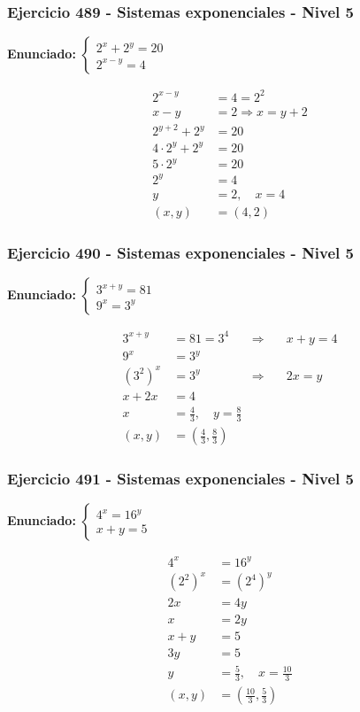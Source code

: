 \documentclass[12pt,a4paper]{article}
\begin{document}
\subsubsection*{Ejercicio 489 - Sistemas exponenciales - Nivel 5}
\textbf{Enunciado:} \(\begin{cases}2^x+2^y=20\\ 2^{x-y}=4\end{cases}\)

\[
\begin{aligned}
2^{x-y}&=4=2^2\\
x-y&=2\Rightarrow x=y+2\\
2^{y+2}+2^y&=20\\
4\cdot2^y+2^y&=20\\
5\cdot2^y&=20\\
2^y&=4\\
y&=2,
\quad x=4\\
(x,y)&=\boxed{(4,2)}
\end{aligned}
\]


\subsubsection*{Ejercicio 490 - Sistemas exponenciales - Nivel 5}
\textbf{Enunciado:} \(\begin{cases}3^{x+y}=81\\ 9^x=3^y\end{cases}\)

\[
\begin{aligned}
3^{x+y}&=81=3^4&\Rightarrow&\quad x+y=4\\
9^x&=3^y\\
(3^2)^x&=3^y&\Rightarrow&\quad 2x=y\\
x+2x&=4\\
x&=\frac43,
\quad y=\frac83\\
(x,y)&=\boxed{\left(\frac43,\frac83\right)}
\end{aligned}
\]


\subsubsection*{Ejercicio 491 - Sistemas exponenciales - Nivel 5}
\textbf{Enunciado:} \(\begin{cases}4^x=16^y\\ x+y=5\end{cases}\)

\[
\begin{aligned}
4^x&=16^y\\
(2^2)^x&=(2^4)^y\\
2x&=4y\\
x&=2y\\
x+y&=5\\
3y&=5\\
y&=\frac53,
\quad x=\frac{10}{3}\\
(x,y)&=\boxed{\left(\frac{10}{3},\frac53\right)}
\end{aligned}
\]
\end{document}
